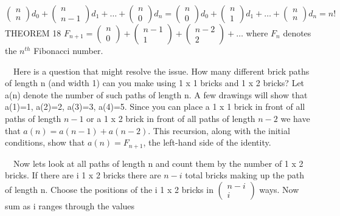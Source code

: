 \documentclass{article}
\begin{document}
\begin{equation*}
\left(\begin{matrix}n\\n\end{matrix}\right)d_0+\left(\begin{matrix}n\\n-1\end{matrix}\right)d_1+{\dots}+\left(\begin{matrix}n\\0\end{matrix}\right)d_n=\left(\begin{matrix}n\\0\end{matrix}\right)d_0+\left(\begin{matrix}n\\1\end{matrix}\right)d_1+{\dots}+\left(\begin{matrix}n\\n\end{matrix}\right)d_n=n!
\end{equation*}
THEOREM 18  
$F_{n+1}=\left(\begin{matrix}n\\0\end{matrix}\right)+\left(\begin{matrix}n-1\\1\end{matrix}\right)+\left(\begin{matrix}n-2\\2\end{matrix}\right)+{\dots}$
 where  $F_n$ denotes the  $n^{\mathit{th}}$ Fibonacci number.  

\ \ Here is a question that might resolve the issue.  How many different brick paths of length  n (and width 1) can you
make using 1 x 1 bricks and 1 x 2 bricks?  Let a(n) denote the number of such paths of length  n.  A few drawings will
show that a(1)=1, a(2)=2, a(3)=3, a(4)=5.  Since you can place a 1 x 1 brick in front of all paths of length  $n-1$ or
a 1 x 2 brick in front of all paths of length  $n-2$ we have that 
$a\left(n\right)=a\left(n-1\right)+a\left(n-2\right)$.  This recursion, along with the initial conditions, show that 
$a\left(n\right)=F_{n+1}$, the left-hand side of the identity.

\ \ Now lets look at all paths of length n and count them by the number of 1 x 2 bricks.  If there are i 1 x 2 bricks
there are  $n-i$ total bricks making up the path of length n.  Choose the positions of the  i 1 x 2 bricks in 
$\left(\begin{matrix}n-i\\i\end{matrix}\right)$ ways.  Now sum as i ranges through the values
\end{document}
